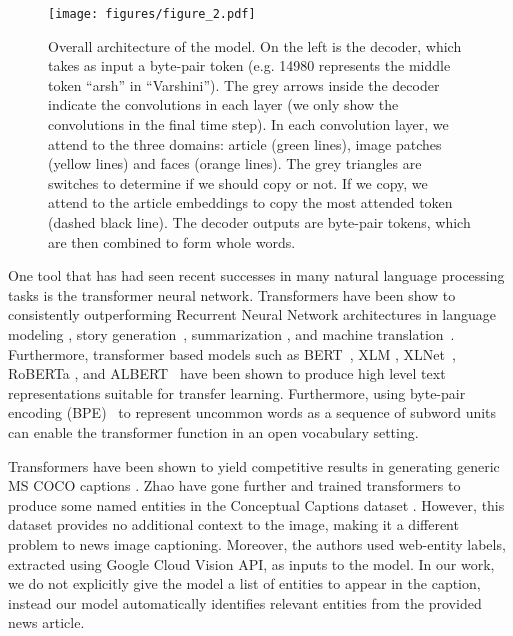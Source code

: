 
\begin{figure*}[t]
   \begin{center}
		\texttt{[image: figures/figure\_2.pdf]}
	\end{center}
       \caption{Overall architecture of the model. On the left is the decoder,
       which takes as input a byte-pair token (e.g. 14980 represents the middle
       token ``arsh'' in ``Varshini''). The grey arrows inside the decoder
       indicate the convolutions in each layer (we only show the convolutions
       in the final time step). In each convolution layer, we attend to the
       three domains: article (green lines), image patches (yellow lines) and
       faces (orange lines). The grey triangles are switches to determine if we
       should copy or not. If we copy, we attend to the article embeddings to
       copy the most attended token (dashed black line). The decoder outputs
       are byte-pair tokens, which are then combined to form whole words.}
    \label{fig:model}
 \end{figure*}

One tool that has had seen recent successes in many natural language processing
tasks is the transformer neural network.
Transformers have been show to consistently
outperforming Recurrent Neural Network architectures in language modeling
\cite{Radford2019LanguageMA},
story generation~\cite{Fan2018HierarchicalNS}, summarization
\cite{Subramanian2019OnEA}, and machine translation~\cite{Bojar2018Findings}.
Furthermore, transformer based models such as BERT~\cite{Devlin2019BERT}, XLM
\cite{Lample2019CrosslingualLM}, XLNet~\cite{Yang2019XLNetGA}, RoBERTa
\cite{Liu2019RoBERTaAR}, and ALBERT~\cite{Lan2019ALBERT} have been shown to
produce high level text representations suitable for transfer learning.
Furthermore, using byte-pair
encoding (BPE)~\cite{Sennrich2015NeuralMT} to represent uncommon words as a
sequence of subword units can enable the transformer function in an open
vocabulary setting.

Transformers have been shown
to yield competitive results in generating generic MS COCO captions
\cite{Zhu2018CaptioningTW, Li2019Boosted}. Zhao \etal
\cite{Zhao2019InformativeIC} have gone further and trained transformers to
produce some named entities in the Conceptual Captions dataset
\cite{Sharma2018ConceptualCA}. However, this dataset provides no additional
context to the image, making it a different problem to news image captioning.
Moreover, the authors used web-entity labels,
extracted using Google Cloud Vision API, as inputs to the model. In our work,
we do not explicitly give the model a list of
entities to appear in the caption, instead our model automatically identifies
relevant entities from the provided news article.


